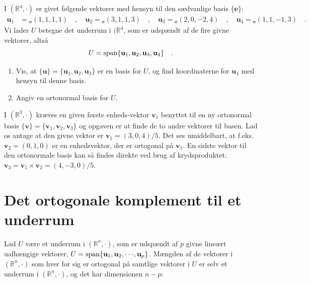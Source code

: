 \begin{exercise} \label{exercLA10.39}
I $(\mathbb{R}^{4}, \cdot)$ er givet følgende vektorer med hensyn til den sædvanlige basis $\{ \mathbf{e} \}$:
\begin{equation*}
\begin{aligned}
\mathbf{u}_{1} &= {_{\mathbf{e}}(1,1,1,1)} \quad , \quad \mathbf{u}_{2} = {_{\mathbf{e}}(3,1,1,3)} \quad , \quad \mathbf{u}_{3} = {_{\mathbf{e}}(2,0,-2,4)} \quad , \quad \mathbf{u}_{4} = {_{\mathbf{e}}(1,1,-1,3)} \quad .
\end{aligned}
\end{equation*}
Vi lader $U$ betegne det underrum i $(\mathbb{R}^{4}$, som er udspændt af de fire givne vektorer, altså
\begin{equation}
U = \mathrm{span}\{\mathbf{u}_{1}, \mathbf{u}_{2}, \mathbf{u}_{3}, \mathbf{u}_{4}\} \quad .
\end{equation}
\begin{enumerate}
\item Vis, at $\{ \mathbf{u} \} = \{ \mathbf{u}_{1}, \mathbf{u}_{2}, \mathbf{u}_{3}\} $ er en basis for $U$, og find koordinaterne for $\mathbf{u}_{4}$ med hensyn til denne basis.
\item Angiv en ortonormal basis for $U$.
\end{enumerate}
\end{exercise}


\begin{example} \label{exampOrto3D}
I $(\mathbb{R}^{3}, \cdot)$ kræves en given første enheds-vektor $\mathbf{v}_{1}$ benyttet til en ny ortonormal basis
$\{ \mathbf{v} \} = \{ \mathbf{v}_{1}, \mathbf{v}_{2}, \mathbf{v}_{3}\}$ og opgaven er at finde de to andre vektorer til basen. Lad os antage at den givne vektor er $ \mathbf{v}_{1} = (3,0,4)/5$. Det ses umiddelbart, at f.eks.  $\mathbf{v}_{2} = (0, 1,0)$ er en enhedsvektor, der er ortogonal på $\mathbf{v}_{1}$. En sidste vektor til den ortonormale basis kan så findes direkte ved brug af krydsproduktet: $\mathbf{v}_{3} = \mathbf{v}_{1} \times \mathbf{v}_{2} = (4, -3, 0)/5$.
\end{example}


\section{Det ortogonale komplement til et underrum}
Lad  $U$ være et underrum  i $(\mathbb{R}^{n}, \cdot)$, som er udspændt af $p$ givne lineært uafhængige vektorer, $U = \mathrm{span}\{\mathbf{u}_{1}, \mathbf{u}_{2}, \cdot \cdot \cdot , \mathbf{u}_{p}\}$. Mængden af de vektorer i $(\mathbb{R}^{n}, \cdot)$ som hver for sig er ortogonal på samtlige vektorer i $U$ er selv et underrum i $(\mathbb{R}^{n}, \cdot)$, og det har dimensionen $n-p$:

